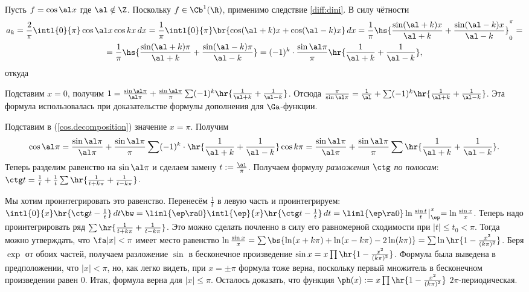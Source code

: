 \documentclass[a4paper]{article}
\newcommand{\intlop}{\intl{0}{\pi}}
\newcommand{\frpi}{\frac{1}{\pi}}
\newcommand{\sbs}[2]{\bigl|_{{#1}}^{{#2}}}
\begin{document}
\begin{ex}
Пусть $f = \cos \al x$ где $\al \notin \Z$. Поскольку $f \in\Cb^1(\R)$, применимо следствие
\ref{diff:dini}. В силу чётности
\begin{multline*}
a_k = \frac{2}{\pi}\intlop\cos \al x \cos k x \,d x= \frpi
\intlop\br{\cos(\al + k)x + \cos(\al - k)x}\,d x = \frpi \hs{\frac{\sin(\al + k)x}{\al + k} +
\frac{\sin(\al-k)x}{\al - k}}_0^\pi=\\
=\frpi \hs{\frac{\sin(\al + k)\pi}{\al + k} +
\frac{\sin(\al-k)\pi}{\al - k}} = (-1)^k\cdot\frac{\sin \al \pi}{\pi}\hr{\frac{1}{\al + k} +
\frac{1}{\al - k}},
\end{multline*}
откуда

Подставим $x = 0$, получим
$1 = \frac{\sin \al \pi}{\al \pi} + \frac{\sin \al \pi}{\pi} \sum (-1)^k \hr{\frac{1}{\al + k} + \frac{1}{\al - k}}$.
Отсюда $\frac{\pi}{\sin \al \pi} = \frac{1}{\al} + \sum (-1)^k\hr{\frac{1}{\al + k} + \frac{1}{\al - k}}$.
Эта формула использовалась при доказательстве формулы дополнения для $\Ga$-функции.

Подставим в (\ref{cos.decomposition}) значение $x=\pi$. Получим
$$\cos\al\pi = \frac{\sin \al \pi}{\al\pi} + \frac{\sin \al \pi}{\pi}\sum (-1)^k\cdot
\hr{\frac{1}{\al + k} + \frac{1}{\al - k}}\cos k\pi=
\frac{\sin \al \pi}{\al\pi} + \frac{\sin \al \pi}{\pi}\sum \hr{\frac{1}{\al + k} + \frac{1}{\al - k}}.$$
Теперь разделим равенство на $\sin\al\pi$ и сделаем замену $t := \frac{\al}{\pi}$. Получаем
формулу \emph{разложения $\ctg$ по полюсам}:
$\ctg t = \frac{1}{t} + \frac{1}{t}\sum \hr{\frac{1}{t + k\pi} + \frac{1}{t - k\pi}}$.

Мы хотим проинтегрировать это равенство. Перенесём $\frac{1}{t}$ в левую часть и проинтегрируем:
$\intl{0}{x}\hr{\ctg t - \frac{1}{t}}\,d t  \bw= \liml{\ep\ra 0}\intl{\ep}{x}\hr{\ctg t -
\frac{1}{t}}\,d t = \liml{\ep\ra0}\ln \frac{\sin t}{t}\sbs{\ep}{x}= \ln \frac{\sin x}{x}$. Теперь
надо проинтегрировать ряд $\sum \hr{\frac{1}{t + k\pi} + \frac{1}{t - k\pi}}$. Это можно сделать
почленно в силу его равномерной сходимости при $|t| \le t_0 < \pi$. Тогда можно утверждать, что
$\fa |x| < \pi$ имеет место равенство $\ln \frac{\sin x}{x} = \sum\bs{\ln(x+k\pi) + \ln(x - k\pi) -
2\ln(k\pi)} = \sum\ln\hr{1 - \frac{x^2}{(k\pi)^2}}$. Беря $\exp$ от обоих частей, получаем
разложение $\sin$ в бесконечное произведение $\sin x = x \prod \hr{1 - \frac{x^2}{(k\pi)^2}}$.
Формула была выведена в предположении, что $|x| < \pi$, но, как легко видеть, при $x = \pm\pi$
формула тоже верна, поскольку первый множитель в бесконечном произведении равен 0. Итак, формула
верна для $|x| \le \pi$. Осталось доказать, что функция $\ph(x) := x \prod \hr{1 -
\frac{x^2}{(k\pi)^2}}$ $2\pi$-периодическая.


\end{ex}
\end{document}

